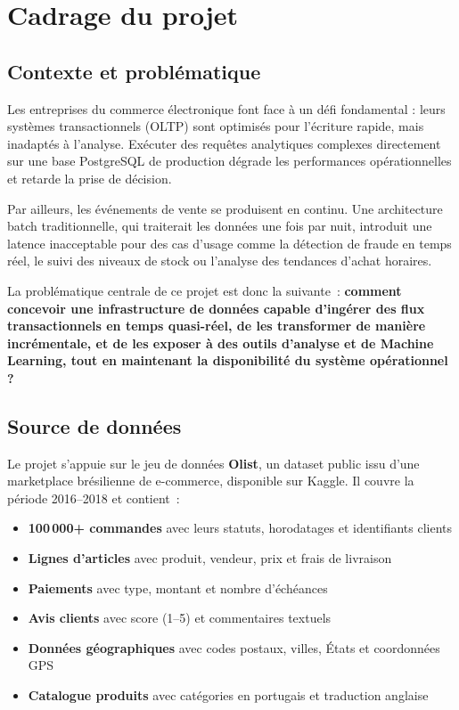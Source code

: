 \chapter{Cadrage du projet}

\section{Contexte et problématique}

Les entreprises du commerce électronique font face à un défi fondamental : leurs systèmes transactionnels (OLTP) sont optimisés pour l'écriture rapide, mais inadaptés à l'analyse. Exécuter des requêtes analytiques complexes directement sur une base PostgreSQL de production dégrade les performances opérationnelles et retarde la prise de décision.

Par ailleurs, les événements de vente se produisent en continu. Une architecture batch traditionnelle, qui traiterait les données une fois par nuit, introduit une latence inacceptable pour des cas d'usage comme la détection de fraude en temps réel, le suivi des niveaux de stock ou l'analyse des tendances d'achat horaires.

La problématique centrale de ce projet est donc la suivante~: \textbf{comment concevoir une infrastructure de données capable d'ingérer des flux transactionnels en temps quasi-réel, de les transformer de manière incrémentale, et de les exposer à des outils d'analyse et de Machine Learning, tout en maintenant la disponibilité du système opérationnel ?}

\section{Source de données}

Le projet s'appuie sur le jeu de données \textbf{Olist}, un dataset public issu d'une marketplace brésilienne de e-commerce, disponible sur Kaggle. Il couvre la période 2016--2018 et contient~:

\begin{itemize}
  \setlength{\itemsep}{0.4em}
  \item \textbf{100\,000+ commandes} avec leurs statuts, horodatages et identifiants clients
  \item \textbf{Lignes d'articles} avec produit, vendeur, prix et frais de livraison
  \item \textbf{Paiements} avec type, montant et nombre d'échéances
  \item \textbf{Avis clients} avec score (1--5) et commentaires textuels
  \item \textbf{Données géographiques} avec codes postaux, villes, États et coordonnées GPS
  \item \textbf{Catalogue produits} avec catégories en portugais et traduction anglaise
\end{itemize}

